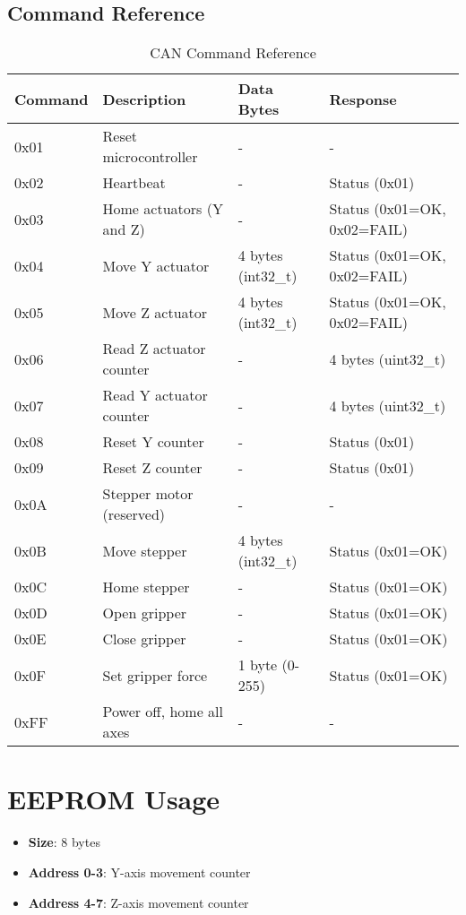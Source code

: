 \documentclass{article}
\begin{document}
\subsection{Command Reference}
\begin{table}[h]
\centering
\begin{tabular}{llll}
\toprule
\textbf{Command} & \textbf{Description} & \textbf{Data Bytes} & \textbf{Response} \\
\midrule
0x01 & Reset microcontroller & - & - \\
0x02 & Heartbeat & - & Status (0x01) \\
0x03 & Home actuators (Y and Z) & - & Status (0x01=OK, 0x02=FAIL) \\
0x04 & Move Y actuator & 4 bytes (int32\_t) & Status (0x01=OK, 0x02=FAIL) \\
0x05 & Move Z actuator & 4 bytes (int32\_t) & Status (0x01=OK, 0x02=FAIL) \\
0x06 & Read Z actuator counter & - & 4 bytes (uint32\_t) \\
0x07 & Read Y actuator counter & - & 4 bytes (uint32\_t) \\
0x08 & Reset Y counter & - & Status (0x01) \\
0x09 & Reset Z counter & - & Status (0x01) \\
0x0A & Stepper motor (reserved) & - & - \\
0x0B & Move stepper & 4 bytes (int32\_t) & Status (0x01=OK) \\
0x0C & Home stepper & - & Status (0x01=OK) \\
0x0D & Open gripper & - & Status (0x01=OK) \\
0x0E & Close gripper & - & Status (0x01=OK) \\
0x0F & Set gripper force & 1 byte (0-255) & Status (0x01=OK) \\
0xFF & Power off, home all axes & - & - \\
\bottomrule
\end{tabular}
\caption{CAN Command Reference}
\end{table}

\section{EEPROM Usage}
\begin{itemize}
    \item \textbf{Size}: 8 bytes
    \item \textbf{Address 0-3}: Y-axis movement counter
    \item \textbf{Address 4-7}: Z-axis movement counter
\end{itemize}
\end{document}
